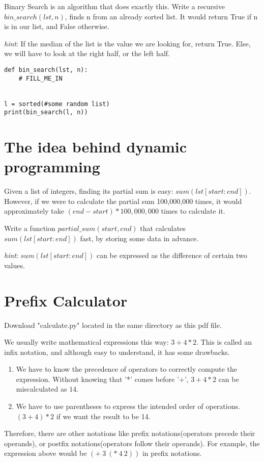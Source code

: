 \documentclass{article}
\begin{document}
Binary Search is an algorithm that does exactly this. Write a recursive
$bin\_search(lst, n)$, finds n from an already sorted list.
It would return True if n is in our list, and False
otherwise.

\textit{hint}: If the median of the list is the value we are looking for, return True.
Else, we will have to look at the right half, or the left half.

\begin{lstlisting}
def bin_search(lst, n):
    # FILL_ME_IN


l = sorted(#some random list)
print(bin_search(l, n))
\end{lstlisting}

\section{The idea behind dynamic programming}
Given a list of integers, finding its partial sum is
easy: $sum(lst[start:end])$. However, if we were to calculate the partial sum
100,000,000 times, it would approximately take $(end-start) * 100,000,000$
times to calculate it.

Write a function $partial\_sum(start, end)$ that calculates
$sum(lst[start:end])$ fast, by storing some data in advance.

\textit{hint}: $sum(lst[start:end])$ can be expressed as the difference of
certain two values.


\section{Prefix Calculator}
Download "calculate.py" located in the same directory as this pdf file.

We usually write mathematical expressions this way:
$3+4*2$. This is called an infix notation, and although easy to understand, it has
some drawbacks.
\begin{enumerate}
  \item We have to know the precedence of operators to correctly compute the
    expression. Without knowing that '*' comes before '+', $3+4*2$ can be
    miscalculated as $14$.
  \item We have to use parentheses to express the intended order of operations.
    $(3+4)*2$ if we want the result to be 14.
\end{enumerate}
Therefore, there are other notations like prefix notations(operators precede
their operands), or postfix notations(operators follow their operands).
For example, the expression above would be $(+\ 3\ (*\ 4\
2))$ in prefix notations.
\end{document}
